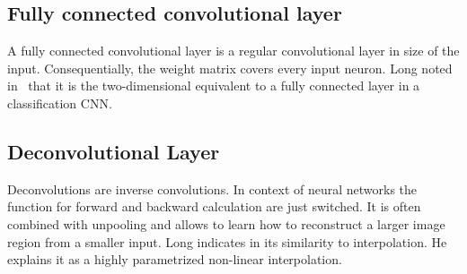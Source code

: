 \subsection{Fully connected convolutional layer}
A fully connected convolutional layer is a regular convolutional layer in size
of the input. Consequentially, the weight matrix covers every input neuron. Long
noted in~\cite{long2014fully} that it is the two-dimensional equivalent to a
fully connected layer in a classification \gls{CNN}.

\subsection{Deconvolutional Layer}
Deconvolutions are inverse convolutions. In context of neural networks the
function for forward and backward calculation are just switched. It is often
combined with unpooling and allows to learn how to reconstruct a larger image
region from a smaller input. Long indicates in \cite{long2014fully} its
similarity to interpolation. He explains it as a highly parametrized non-linear
interpolation.
